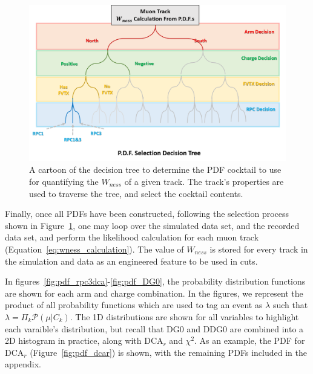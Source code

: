 \begin{figure}[ht]
  \centering
  \includegraphics[width=\linewidth,trim=4 70 4 4,clip]{./figures/pdf_selection_tree.png}
  \caption{
    A cartoon of the decision tree to determine the PDF cocktail to use for
    quantifying the $W_{ness}$ of a given track. The track's properties are used
    to traverse the tree, and select the cocktail contents.
  }
  \label{fig:pdf_selection_tree}
\end{figure}

Finally, once all PDFs have been constructed, following the selection process
shown in Figure~\ref{fig:pdf_selection_tree}, one may loop over the simulated
data set, and the recorded data set, and perform the likelihood calculation for
each muon track (Equation~\ref{eq:wness_calculation}). The value of
$W_{ness}$ is stored for every track in the simulation and data as an
engineered feature to be used in cuts.

In figures~\ref{fig:pdf_rpc3dca}-\ref{fig:pdf_DG0}, the probability
distribution functions are shown for each arm and charge combination. In the
figures, we represent the product of all probability functions which are used
to tag an event as $\lambda$ such that $\lambda = \Pi_{k} \mathcal{P}(\mu \vert
C_k)$. The 1D distributions are shown for all variables to highlight each
varaible's distribution, but recall that DG0 and DDG0 are combined into a 2D
histogram in practice, along with DCA$_r$ and $\chi^2$. As an example, the PDF
for DCA$_r$ (Figure~\ref{fig:pdf_dcar}) is shown, with the remaining PDFs
included in the appendix.

